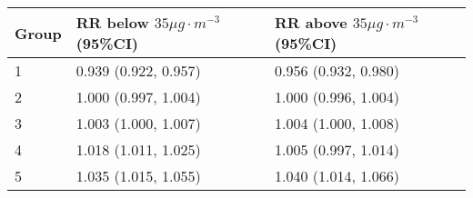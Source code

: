 \begin{tabular}{lll}
  \hline
Group & RR below $35 \mu g \cdot m^{-3}$ (95\%CI) & RR above $35 \mu g \cdot m^{-3}$ (95\%CI) \\ 
  \hline
   1 & 0.939 (0.922, 0.957) & 0.956 (0.932, 0.980) \\ 
     2 & 1.000 (0.997, 1.004) & 1.000 (0.996, 1.004) \\ 
     3 & 1.003 (1.000, 1.007) & 1.004 (1.000, 1.008) \\ 
     4 & 1.018 (1.011, 1.025) & 1.005 (0.997, 1.014) \\ 
     5 & 1.035 (1.015, 1.055) & 1.040 (1.014, 1.066) \\ 
   \hline
\end{tabular}

